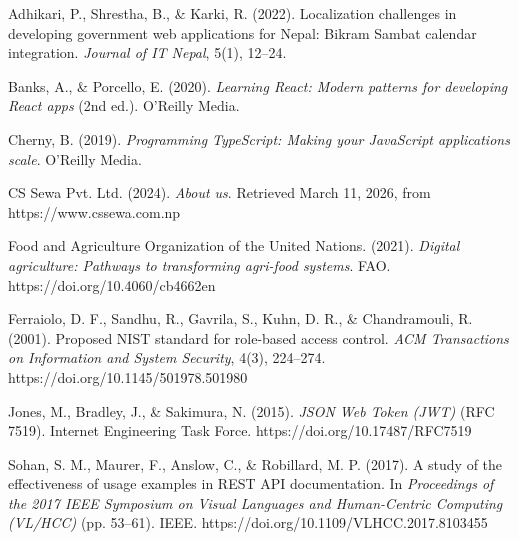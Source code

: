 \documentclass[12pt,a4paper]{report}
\begin{document}
\newpage
\renewcommand{\bibname}{REFERENCES}

\begin{thebibliography}{}

Adhikari, P., Shrestha, B., \& Karki, R. (2022). Localization challenges in developing government web applications for Nepal: Bikram Sambat calendar integration. \textit{Journal of IT Nepal}, 5(1), 12--24.

Banks, A., \& Porcello, E. (2020). \textit{Learning React: Modern patterns for developing React apps} (2nd ed.). O'Reilly Media.

Cherny, B. (2019). \textit{Programming TypeScript: Making your JavaScript applications scale}. O'Reilly Media.

CS Sewa Pvt. Ltd. (2024). \textit{About us}. Retrieved March 11, 2026, from https://www.cssewa.com.np

Food and Agriculture Organization of the United Nations. (2021). \textit{Digital agriculture: Pathways to transforming agri-food systems}. FAO. https://doi.org/10.4060/cb4662en

Ferraiolo, D. F., Sandhu, R., Gavrila, S., Kuhn, D. R., \& Chandramouli, R. (2001). Proposed NIST standard for role-based access control. \textit{ACM Transactions on Information and System Security}, 4(3), 224--274. https://doi.org/10.1145/501978.501980

Jones, M., Bradley, J., \& Sakimura, N. (2015). \textit{JSON Web Token (JWT)} (RFC 7519). Internet Engineering Task Force. https://doi.org/10.17487/RFC7519

Sohan, S. M., Maurer, F., Anslow, C., \& Robillard, M. P. (2017). A study of the effectiveness of usage examples in REST API documentation. In \textit{Proceedings of the 2017 IEEE Symposium on Visual Languages and Human-Centric Computing (VL/HCC)} (pp. 53--61). IEEE. https://doi.org/10.1109/VLHCC.2017.8103455

\end{thebibliography}

\end{document}
